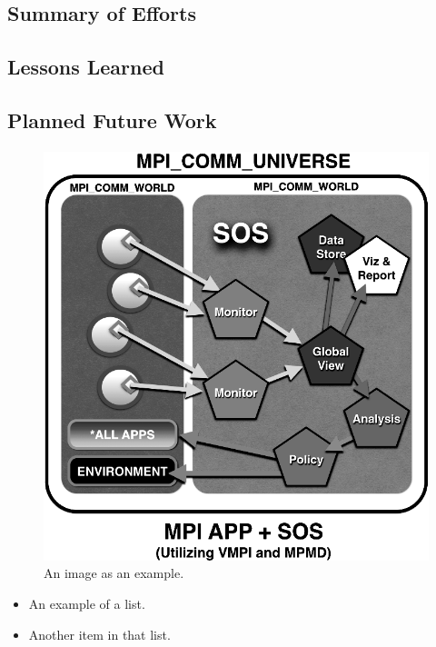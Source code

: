 \documentclass{acmtog}
\begin{document}
\subsection{Summary of Efforts}
\subsection{Lessons Learned}
\subsection{Planned Future Work}
\paragraph{}
\begin{figure}
\centering
\includegraphics[width=0.7\linewidth]{./sos-overview-2}
\caption[Figure 1: SOS]{An image as an example.}
\label{fig:sos-overview.png}
\end{figure}
\begin{itemize}
\item{An example of a list.}
\item{Another item in that list.}
\end{itemize}
\newpage
\nocite{*}


\end{document}

